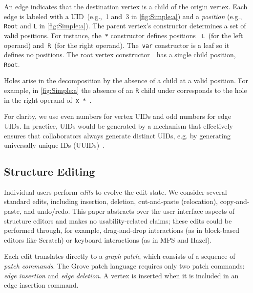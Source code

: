 An edge indicates that the destination vertex is a child of the origin vertex. 
Each edge is labeled with a UID~(e.g.,~1 and~3 in \autoref{fig:Simple:a})
and a \emph{position} (e.g., \texttt{Root} and \texttt{L} in \autoref{fig:Simple:a}). 
The parent vertex's constructor determines a set of valid {positions}. 
For instance, the~\texttt{*} constructor defines positions
~\texttt{L}~(for the left operand)
and~\texttt{R}~(for the right operand).
The~\texttt{var} constructor is a leaf so it defines no positions.
The root vertex constructor~\textbullet~has a single child position, \texttt{Root}.


Holes arise in the decomposition by the absence of a child at a valid position.
For example, in \autoref{fig:Simple:a} the absence of an \texttt{R} child under \vSimpleTimes{}
corresponds to the hole in the right operand of~\texttt{x * \hole}.

For clarity, we use even numbers for vertex UIDs and odd numbers for edge UIDs. In practice, UIDs would be generated by a mechanism
that effectively ensures that collaborators always generate distinct UIDs, e.g. by generating
universally unique IDs (UUIDs)~\cite{paskin1999toward}.


\subsection{Structure Editing}%
\label{sub:Single-User Actions}
\figureWrapMove

Individual users perform \emph{edits} to evolve the edit state. We consider several standard edits, including insertion, deletion, cut-and-paste (relocation), copy-and-paste, and undo/redo. This paper abstracts over the user interface aspects of structure editors and makes no usability-related claims; these edits could be performed through, for example, drag-and-drop interactions (as in block-based editors like Scratch) or keyboard interactions (as in MPS and Hazel).  %

Each edit translates directly to a \emph{graph patch}, which consists of a sequence of \emph{patch commands}. The Grove patch language requires only two patch commands:  \emph{edge insertion} and \emph{edge deletion}. A vertex is inserted when it is included in an edge insertion command.

